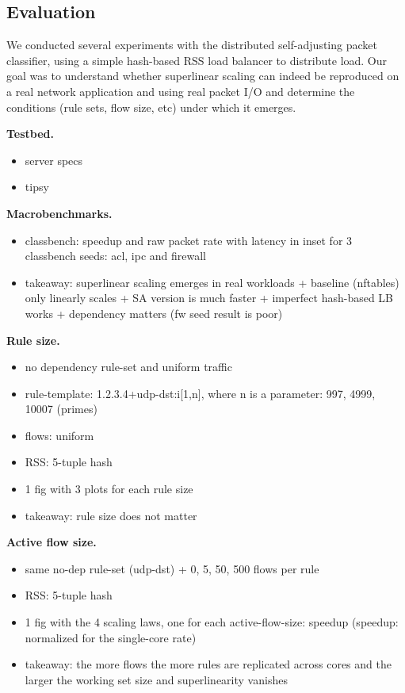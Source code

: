 \subsection{Evaluation}
\label{sec:sa-nf-tables-eval}

We conducted several experiments with the distributed self-adjusting packet classifier, using a simple hash-based RSS load balancer to distribute load. Our goal was to understand whether superlinear scaling can indeed be reproduced on a real network application and using real packet I/O and determine the conditions (rule sets, flow size, etc) under which it emerges.

\noindent
\textbf{Testbed.} %

\begin{itemize}
\item server specs
\item tipsy
\end{itemize}

\noindent
\textbf{Macrobenchmarks.} %
\begin{itemize}
\item classbench: speedup and raw packet rate with latency in inset for 3 classbench seeds: acl, ipc and firewall
\item takeaway: superlinear scaling emerges in real workloads + baseline (nftables) only linearly scales + SA version is much faster + imperfect hash-based LB works + dependency matters (fw seed result is poor)
\end{itemize}

\noindent
\textbf{Rule size.} %
\begin{itemize}
\item no dependency rule-set and uniform traffic
\item rule-template: 1.2.3.4+udp-dst:i[1,n], where n is a parameter: 997, 4999, 10007 (primes)
\item flows: uniform 
\item RSS: 5-tuple hash
\item 1 fig with 3 plots for each rule size
\item takeaway: rule size does not matter
\end{itemize}

\noindent
\textbf{Active flow size.} %
\begin{itemize}
\item same no-dep rule-set (udp-dst) + 0, 5, 50, 500 flows per rule
\item RSS: 5-tuple hash
\item 1 fig with the 4 scaling laws, one for each active-flow-size: speedup (speedup: normalized for the single-core rate)
\item takeaway: the more flows the more rules are replicated across cores and the larger the working set size and superlinearity vanishes
\end{itemize}

